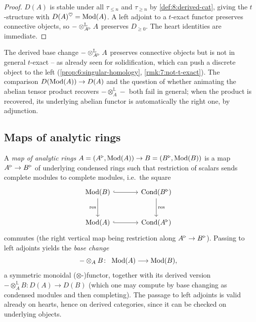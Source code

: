 \begin{proof}
$D(A)$ is stable under all $\tau_{\le n}$ and $\tau_{\ge n}$ by
\cref{def:8:derived-cat}, giving the $t$-structure with
$D(A)^{\heartsuit}=\operatorname{Mod}(A)$. A left adjoint to a $t$-exact functor preserves
connective objects, so $-\otimes^{\mathbb{L}}_{A^{\triangleright}}A$ preserves $D_{\ge0}$. The
heart identities are immediate.
\end{proof}

\begin{remark}
\label{rmk:8:not-t-exact}
The derived base change $-\otimes^{\mathbb{L}}_{A^{\triangleright}}A$ preserves connective
objects but is not in general $t$-exact -- as already seen for solidification,
which can push a discrete object to the left (\cref{prop:6:singular-homology},
\cref{rmk:7:not-t-exact}). The comparison $D(\operatorname{Mod}(A))\to D(A)$ and the
question of whether animating the abelian tensor product recovers
$-\otimes^{\mathbb{L}}_{A}-$ both fail in general; when the product is recovered,
its underlying abelian functor is automatically the right one, by adjunction.
\end{remark}

\subsection{Maps of analytic rings}

\begin{definition}
\label{def:8:maps-analytic-rings}
A \emph{map of analytic rings} $A=(A^{\triangleright},\operatorname{Mod}(A))\to B=(B^{\triangleright},\operatorname{Mod}(B))$ is a map
$A^{\triangleright}\to B^{\triangleright}$ of underlying condensed rings such that restriction of scalars
sends complete modules to complete modules, i.e.\ the square
\begin{equation*}
\begin{tikzcd}[column sep=large, row sep=large]
\Mod(B)\arrow[r, hook]\arrow[d, "\mathrm{res}"'] & \Cond(\ur B)\arrow[d, "\mathrm{res}"] \\
\Mod(A)\arrow[r, hook] & \Cond(\ur A)
\end{tikzcd}
\end{equation*}
commutes (the right vertical map being restriction along $A^{\triangleright}\to B^{\triangleright}$).
Passing to left adjoints yields the \emph{base change}
\begin{equation*}
-\otimes_{A}B\colon\ \Mod(A)\longrightarrow\Mod(B),
\end{equation*}
a symmetric monoidal ($\otimes$-)functor, together with its derived version
$-\otimes^{\mathbb{L}}_{A}B\colon D(A)\to D(B)$ (which one may compute by base
changing as condensed modules and then completing). The passage to left adjoints
is valid already on hearts, hence on derived categories, since it can be checked
on underlying objects.
\end{definition}


